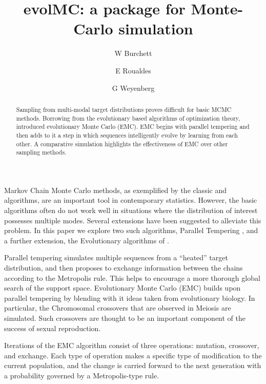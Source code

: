 \documentclass[12pt]{article}\usepackage[]{graphicx}\usepackage[]{color}
\title{evolMC: a package for Monte-Carlo simulation}
\author{W Burchett \and E Roualdes \and G Weyenberg}
\begin{document}
\maketitle
\doublespacing

\begin{abstract}
  Sampling from multi-modal target distributions proves difficult for basic MCMC methods.  Borrowing from the evolutionary based algorithms of optimization theory, \cite{Liang:2000} introduced evolutionary Monte Carlo (EMC).  EMC begins with parallel tempering and then adds to it a step in which sequences intelligently evolve by learning from each other.  A comparative simulation highlights the effectiveness of EMC over other sampling methods.
\end{abstract}

\vspace{1cm}
\label{sec:introduction}
\noindent Markov Chain Monte Carlo methods, as exemplified by the classic
\cite{Metropolis:1953} and \cite{Hastings:1970} algorithms, are an
important tool in contemporary statistics.  However, the basic
algorithms often do not work well in situations where the distribution of
interest possesses multiple modes. Several extensions have been
suggested to alleviate this problem. In this paper we explore two such
algorithms, Parallel Tempering \citep{swendsen1986replica}, and a further
extension, the Evolutionary algorithms of \cite{Liang:2000}.

Parallel tempering  simulates multiple sequences from a ``heated''
target distribution, and then proposes to exchange information between
the chains according to the Metropolis rule. This helps to encourage a
more thorough global search of the support space. \citep{Liang:2011}
Evolutionary Monte Carlo (EMC) builds upon parallel tempering by
blending with it ideas taken from evolutionary biology. In particular,
the Chromosomal crossovers that are observed in Meiosis are
simulated. Such crossovers are thought to be an important component of
the success of sexual reproduction.



Iterations of the EMC algorithm consist of three operations: mutation,
crossover, and exchange. Each type of operation makes a specific type
of modification to the current population, and the change is carried
forward to the next generation with a probability governed by a
Metropolis-type rule.\citep{Liang:2011}
\end{document}
